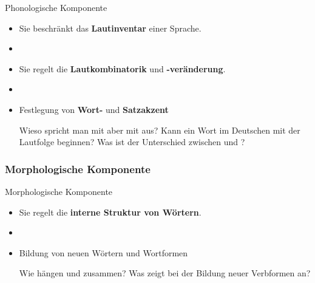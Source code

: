 \begin{frame}{Phonologische Komponente}

	\begin{itemize}
		\item Sie beschränkt das \textbf{Lautinventar} einer Sprache.
		\item[]
		\item Sie regelt die \textbf{Lautkombinatorik} und \textbf{-veränderung}.
		\item[]
		\item Festlegung von \textbf{Wort-} und \textbf{Satzakzent}
		
\pause
		 \ea Wieso spricht man  mit \textipa{[t]} aber  mit \textipa{[d]} aus?
\pause
			\ex Kann ein Wort im Deutschen mit der Lautfolge \textipa{[Ng]} beginnen?
\pause
			\ex Was ist der Unterschied zwischen  und ?
		\z	  
	
	\end{itemize}
	
\end{frame}


\subsubsection{Morphologische Komponente}

\begin{frame}{Morphologische Komponente}

\begin{itemize}
	\item Sie regelt die \textbf{interne Struktur von Wörtern}.
	\item[]
	\item Bildung von neuen Wörtern und Wortformen
\pause
				
\ea Wie hängen  und  zusammen?
\pause
	\ex Was zeigt  bei der Bildung neuer Verbformen an?
\z
			
\end{itemize}

\end{frame}


